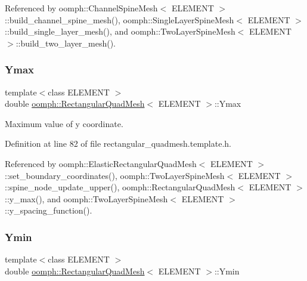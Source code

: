 Referenced by oomph\+::\+Channel\+Spine\+Mesh$<$ E\+L\+E\+M\+E\+N\+T $>$\+::build\+\_\+channel\+\_\+spine\+\_\+mesh(), oomph\+::\+Single\+Layer\+Spine\+Mesh$<$ E\+L\+E\+M\+E\+N\+T $>$\+::build\+\_\+single\+\_\+layer\+\_\+mesh(), and oomph\+::\+Two\+Layer\+Spine\+Mesh$<$ E\+L\+E\+M\+E\+N\+T $>$\+::build\+\_\+two\+\_\+layer\+\_\+mesh().

\mbox{\label{classoomph_1_1RectangularQuadMesh_aacbacc3a0e6ea8508abb3140ba343ffa}} 
\subsubsection{\texorpdfstring{Ymax}{Ymax}}
{\footnotesize\ttfamily template$<$class E\+L\+E\+M\+E\+NT $>$ \\
double \hyperlink{classoomph_1_1RectangularQuadMesh}{oomph\+::\+Rectangular\+Quad\+Mesh}$<$ E\+L\+E\+M\+E\+NT $>$\+::Ymax\hspace{0.3cm}{\ttfamily [protected]}}



Maximum value of y coordinate. 



Definition at line 82 of file rectangular\+\_\+quadmesh.\+template.\+h.



Referenced by oomph\+::\+Elastic\+Rectangular\+Quad\+Mesh$<$ E\+L\+E\+M\+E\+N\+T $>$\+::set\+\_\+boundary\+\_\+coordinates(), oomph\+::\+Two\+Layer\+Spine\+Mesh$<$ E\+L\+E\+M\+E\+N\+T $>$\+::spine\+\_\+node\+\_\+update\+\_\+upper(), oomph\+::\+Rectangular\+Quad\+Mesh$<$ E\+L\+E\+M\+E\+N\+T $>$\+::y\+\_\+max(), and oomph\+::\+Two\+Layer\+Spine\+Mesh$<$ E\+L\+E\+M\+E\+N\+T $>$\+::y\+\_\+spacing\+\_\+function().

\mbox{\label{classoomph_1_1RectangularQuadMesh_ade53fec7446044418ccba9f55d692adb}} 
\subsubsection{\texorpdfstring{Ymin}{Ymin}}
{\footnotesize\ttfamily template$<$class E\+L\+E\+M\+E\+NT $>$ \\
double \hyperlink{classoomph_1_1RectangularQuadMesh}{oomph\+::\+Rectangular\+Quad\+Mesh}$<$ E\+L\+E\+M\+E\+NT $>$\+::Ymin\hspace{0.3cm}{\ttfamily [protected]}}



